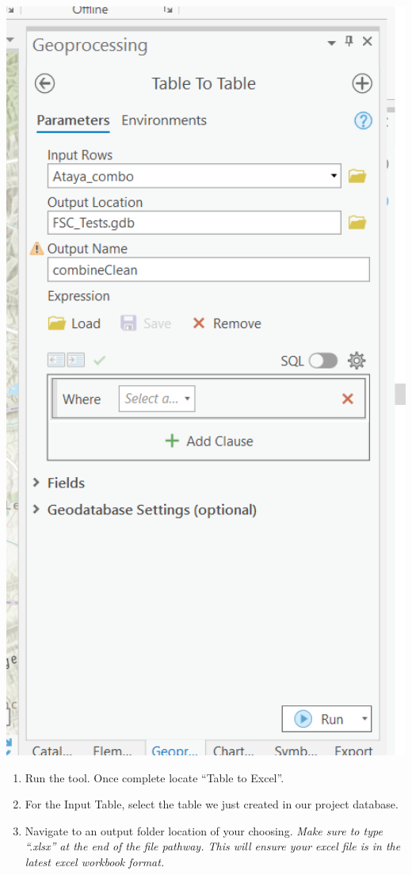 \documentclass[
]{book}
\providecommand{\tightlist}{%
  \setlength{\itemsep}{0pt}\setlength{\parskip}{0pt}}
\begin{document}
\includegraphics[width=500pt]{04_gis_screenshots/19_table_table}

\begin{enumerate}
\def\labelenumi{\arabic{enumi}.}
\setcounter{enumi}{4}
\tightlist
\item
  Run the tool. Once complete locate ``Table to Excel''.
\item
  For the Input Table, select the table we just created in our project database.
\item
  Navigate to an output folder location of your choosing. \emph{Make sure to type ``.xlsx'' at the end of the file pathway. This will ensure your excel file is in the latest excel workbook format.}
\end{enumerate}
\end{document}
